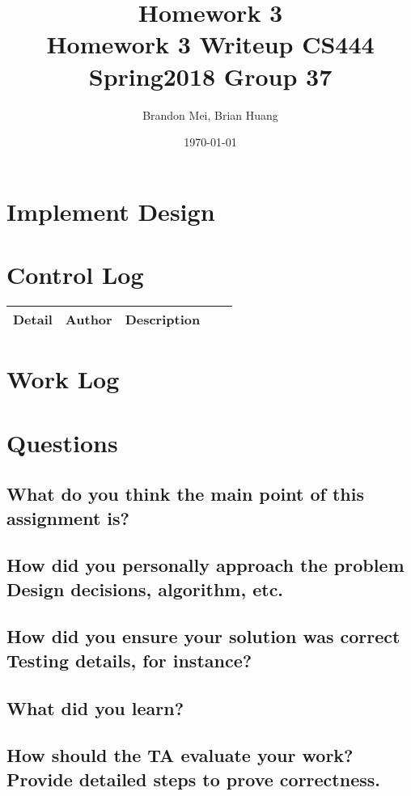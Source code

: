 \documentclass[onecolumn, draftclsnofoot, 10pt, titlepage, compsoc]{IEEEtran}
\title
{%
	Homework 3 \\
	\vspace{0.4cm}
	\large Homework 3 Writeup
	\vspace{0.4cm}
	\large CS444 Spring2018 Group 37
}
\author{Brandon Mei, Brian Huang}
\date{\today}
\begin{document}
\maketitle

\newpage

\section{Implement Design}


\section{Control Log}

\begin{tabular}{l p{5cm} l p{5cm} l}
\textbf{Detail} & \textbf{Author} & \textbf{Description}\\
\hline
\hline
\hline
\hline
\end{tabular}

\section{Work Log}


\section{Questions}

\subsection{What do you think the main point of this assignment is?}

\subsection{How did you personally approach the problem Design decisions, algorithm, etc.}

\subsection{How did you ensure your solution was correct Testing details, for instance?}

\subsection{What did you learn?}

\subsection{How should the TA evaluate your work? Provide detailed steps to prove correctness.}

\nocite{*}


\end{document}
